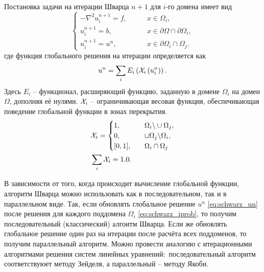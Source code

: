 Постановка задачи на итерации Шварца $n+1$ для $i$-го домена имеет вид
\begin{equation}
\begin{cases}
\label{eq:schwarz_iprob}
-\nabla^2 u_i^{n+1} = f, \qquad &x\in\Omega_i,  \\
u_i^{n+1} = b, \qquad &x\in\partial\Omega \cap \partial\Omega_i, \\
u_i^{n+1} = u^n, \qquad &x\in\partial\Omega_i \cap \Omega_j.
\end{cases}
\end{equation}
где функция глобального решения на итерации определяется как
\begin{equation}
\label{eq:schwarz_un}
u^n = \sum_i E_i\left(\mathcal{X}_i \left(u_i^{n}\right)\right).
\end{equation}
Здесь $E_i$ -- функционал, расширяющий функцию, заданную в домене $\Omega_i$ на домен $\Omega$, дополняя её нулями.
$\mathcal{X}_i$ -- ограничивающая весовая функция, обеспечивающая поведение глобальной функции в зонах перекрытия.
\begin{equation}
\label{eq:schwarz_chi}
\begin{aligned}
& \mathcal{X}_i = \begin{cases}
   1, \qquad &\Omega_i \backslash \cup \Omega_j, \\
   0, \qquad &\cup \Omega_j \backslash \Omega_i, \\
   [0, 1], \quad & \Omega_i \cap \Omega_j
  \end{cases} \\
& \sum_i \mathcal{X}_i = 1.0.
\end{aligned}
\end{equation}

В зависимости от того, когда происходит вычисление глобальной функции, алгоритм Шварца можно
использовать как в последовательном, так и в параллельном виде.
Так, если обновлять глобальное решение $u^n$ \cref{eq:schwarz_un} после решения
для каждого поддомена $\Omega_i$ \cref{eq:schwarz_iprob}, то получим последовательный (классический) алгоитм Шварца.
Если же обновлять глобальное решение один раз на итерации после расчёта всех поддоменов, то
получим параллельный алгоритм.
Можно провести аналогию с итерационными алгоритмами решения систем линейных уравнений:\
последовательный алгоритм соответствуюет методу Зейделя, а параллельный -- методу Якоби. 

\label{sec:schwarz_fem_grid}

